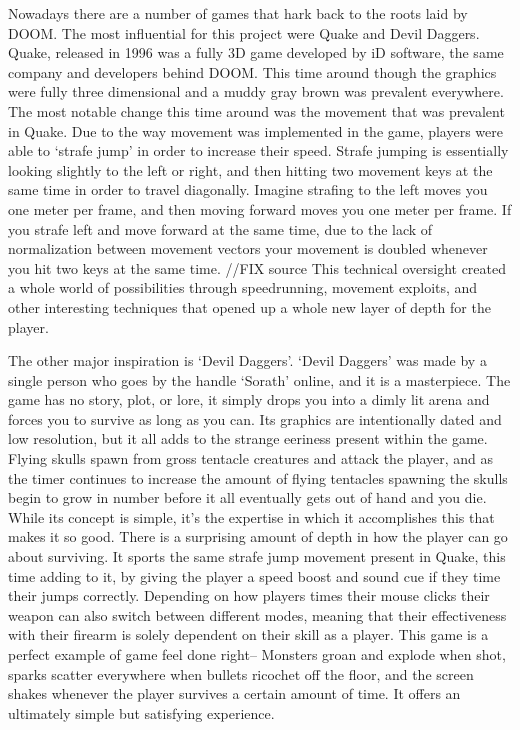 \documentclass[10pt,twocolumn]{article}
\begin{document}
Nowadays there are a number of games that hark back to the roots laid by DOOM. The most influential for this project were Quake and Devil Daggers. Quake, released in 1996 was a fully 3D game developed by iD software, the same company and developers behind DOOM. This time around though the graphics were fully three dimensional and a muddy gray brown was prevalent everywhere. The most notable change this time around was the movement that was prevalent in Quake. Due to the way movement was implemented in the game, players were able to ‘strafe jump’ in order to increase their speed. Strafe jumping is essentially looking slightly to the left or right, and then hitting two movement keys at the same time in order to travel diagonally. Imagine strafing to the left moves you one meter per frame, and then moving forward moves you one meter per frame. If you strafe left and move forward at the same time, due to the lack of normalization between movement vectors your movement is doubled whenever you hit two keys at the same time. //FIX source This technical oversight created a whole world of possibilities through speedrunning, movement exploits, and other interesting techniques that opened up a whole new layer of depth for the player.

The other major inspiration is ‘Devil Daggers’. ‘Devil Daggers’ was made by a single person who goes by the handle ‘Sorath’ online, and it is a masterpiece. The game has no story, plot, or lore, it simply drops you into a dimly lit arena and forces you to survive as long as you can. Its graphics are intentionally dated and low resolution, but it all adds to the strange eeriness present within the game. Flying skulls spawn from gross tentacle creatures and attack the player, and as the timer continues to increase the amount of flying tentacles spawning the skulls begin to grow in number before it all eventually gets out of hand and you die. While its concept is simple, it's the expertise in which it accomplishes this that makes it so good. There is a surprising amount of depth in how the player can go about surviving. It sports the same strafe jump movement present in Quake, this time adding to it, by giving the player a speed boost and sound cue if they time their jumps correctly. Depending on how players times their mouse clicks their weapon can also switch between different modes, meaning that their effectiveness with their firearm is solely dependent on their skill as a player. This game is a perfect example of game feel done right-- Monsters groan and explode when shot, sparks scatter everywhere when bullets ricochet off the floor, and the screen shakes whenever the player survives a certain amount of time. It offers an ultimately simple but satisfying experience.
\end{document}

